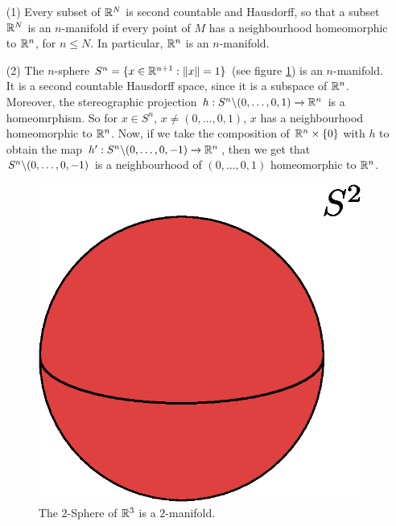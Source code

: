 \begin{example}\label{example_1.1}
    \begin{enumerate}
        \item[(1)] Every subset of $\mathbb{R}^N$ is second countable and Hausdorff, so
            that a subset  $\mathbb{R}^N$ is an  $n$-manifold if every point of  $M$ has
            a neighbourhood homeomorphic to  $\mathbb{R}^n$, for $n \leq N$. In
            particular, $\mathbb{R}^n$ is an $n$-manifold.

            \item[(2)] The $n$-sphere  $S^n=\{x \in \mathbb{R}^{n+1} : \|x\|=1\}$ (see
                figure \ref{fig_1.1}) is an $n$-manifold. It is a second countable
                Hausdorff space, since it is a subspace of  $\mathbb{R}^n$. Moreover, the
                stereographic projection $h:S^n \backslash (0, \dots, 0,1)
                \xrightarrow{} \mathbb{R}^n$ is a homeomrphism. So for $x \in S^n$,
                $x \neq (0, \dots, 0,1)$, $x$ has a neighbourhood homeomorphic to
                $\mathbb{R}^n$. Now, if we take the composition of  $\mathbb{R}^n \times \{0\}$
                with $h$ to obtain the map  $h':S^n \backslash (0,\dots,0,-1)
                \xrightarrow{} \mathbb{R}^n$, then we get that $S^n \backslash (0, \dots, 0,-1)$
                is a neighbourhood of $(0, \dots, 0,1)$ homeomorphic to $\mathbb{R}^n$.
                  \begin{figure}[h]
                     \centering
                     \includegraphics[scale=0.5]{Figures/Chapter1/2_sphere.eps}
                     \caption{The $2$-Sphere of $\mathbb{R}^3$ is a $2$-manifold.}
                     \label{fig_1.1}
                 \end{figure}


\end{enumerate}
\end{example}
